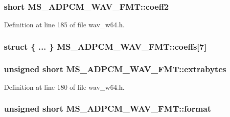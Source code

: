 \subsubsection[{\texorpdfstring{coeff2}{coeff2}}]{\setlength{\rightskip}{0pt plus 5cm}short M\+S\+\_\+\+A\+D\+P\+C\+M\+\_\+\+W\+A\+V\+\_\+\+F\+M\+T\+::coeff2}\hypertarget{struct_m_s___a_d_p_c_m___w_a_v___f_m_t_a96a05883a256312c0d491b543e79be30}{}\label{struct_m_s___a_d_p_c_m___w_a_v___f_m_t_a96a05883a256312c0d491b543e79be30}


Definition at line 185 of file wav\+\_\+w64.\+h.

\subsubsection[{\texorpdfstring{coeffs}{coeffs}}]{\setlength{\rightskip}{0pt plus 5cm}struct \{ ... \} 	 M\+S\+\_\+\+A\+D\+P\+C\+M\+\_\+\+W\+A\+V\+\_\+\+F\+M\+T\+::coeffs\mbox{[}7\mbox{]}}\hypertarget{struct_m_s___a_d_p_c_m___w_a_v___f_m_t_ab2927504c4f60f51b037e3f31f2691ff}{}\label{struct_m_s___a_d_p_c_m___w_a_v___f_m_t_ab2927504c4f60f51b037e3f31f2691ff}
\subsubsection[{\texorpdfstring{extrabytes}{extrabytes}}]{\setlength{\rightskip}{0pt plus 5cm}unsigned short M\+S\+\_\+\+A\+D\+P\+C\+M\+\_\+\+W\+A\+V\+\_\+\+F\+M\+T\+::extrabytes}\hypertarget{struct_m_s___a_d_p_c_m___w_a_v___f_m_t_a80a53e64014ab0229ea691734c9e6040}{}\label{struct_m_s___a_d_p_c_m___w_a_v___f_m_t_a80a53e64014ab0229ea691734c9e6040}


Definition at line 180 of file wav\+\_\+w64.\+h.

\subsubsection[{\texorpdfstring{format}{format}}]{\setlength{\rightskip}{0pt plus 5cm}unsigned short M\+S\+\_\+\+A\+D\+P\+C\+M\+\_\+\+W\+A\+V\+\_\+\+F\+M\+T\+::format}\hypertarget{struct_m_s___a_d_p_c_m___w_a_v___f_m_t_a8ad84a2316954e7a0d25d0a458f8fa7a}{}\label{struct_m_s___a_d_p_c_m___w_a_v___f_m_t_a8ad84a2316954e7a0d25d0a458f8fa7a}


